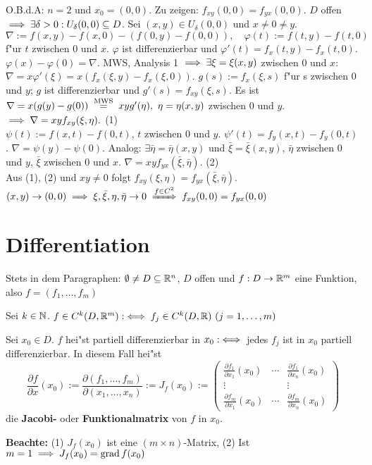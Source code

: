 \documentclass[a4paper,twoside,DIV15,BCOR12mm,chapterprefix=true,headings=twolinechapter]{scrbook}
\begin{document}
\begin{beweis}
O.B.d.A: $n=2$ und $x_0=(0,0)$. Zu zeigen: $f_{xy}(0,0)=f_{yx}(0,0)$. $D$ offen $\implies\exists\delta>0: U_\delta(0,0)\subseteq D$. Sei $(x,y) \in U_\delta(0,0)$ und $x\ne 0\ne y$. $$\nabla:=f(x,y)-f(x,0)-(f(0,y)-f(0,0)),\quad\varphi(t):=f(t,y)-f(t,0)$$ f"ur $t$ zwischen $0$ und $x$. $\varphi$ ist differenzierbar und $\varphi'(t)=f_x(t,y)-f_x(t,0)$. $\varphi(x)-\varphi(0)=\nabla$. MWS, Analysis 1 $\implies\exists\xi=\xi(x,y)$ zwischen $0$ und $x$: $\nabla=x\varphi'(\xi)=x(f_x(\xi,y)-f_x(\xi,0))$. $g(s):=f_x(\xi,s)$ f"ur s zwischen $0$ und $y$; $g$ ist differenzierbar und $g'(s)=f_{xy}(\xi,s)$. Es ist $\nabla=x(g(y)-g(0))\gleichnach{MWS}xyg'(\eta),\ \eta=\eta(x,y)$ zwischen $0$ und $y$. $\implies \nabla=xyf_{xy}(\xi,\eta).$ (1)\\
$\psi(t):=f(x,t)-f(0,t)$, $t$ zwischen $0$ und $y$. $\psi'(t)=f_y(x,t)-f_y(0,t)$. $\nabla=\psi(y)-\psi(0)$. Analog: $\exists \bar\eta=\bar\eta(x,y)$ und $\bar\xi=\bar\xi(x,y)$, $\bar\eta$ zwischen $0$ und $y$, $\bar\xi$ zwischen $0$ und $x$. $\nabla=xyf_{yx}(\bar\xi,\bar\eta).$ (2)\\
Aus (1), (2) und $xy\ne0$ folgt $f_{xy}(\xi,\eta)=f_{yx}(\bar\xi,\bar\eta)$. $(x,y)\to(0,0)\folgt\xi,\bar\xi,\eta,\bar\eta\to 0\folgtwegen{f\in C^2}f_{xy}(0,0)=f_{yx}(0,0)$
\end{beweis}

\chapter{Differentiation}
\def\grad{\mathop{\rm grad}\nolimits}

\begin{vereinbarung}
Stets in dem Paragraphen: $\emptyset\ne D\subseteq\mathbb{R}^n$, $D$ offen und $f:D\to\mathbb{R}^m$ eine Funktion, also $f=(f_1,\ldots,f_m)$
\end{vereinbarung}

\begin{definition*}
\begin{liste}
\item Sei $k\in\mathbb{N}$. $f\in C^k(D,\MdR^m) :\equizu f_j\in C^k(D,\MdR)\ (j=1,\ldots,m)$
\item Sei $x_0\in D$. $f$ hei"st partiell differenzierbar in $x_0 :\iff$ jedes $f_j$ ist in $x_0$ partiell differenzierbar. In diesem Fall hei"st
$$\frac{\partial f}{\partial x}(x_0):=\frac{\partial(f_1,\ldots,f_m)}{\partial(x_1,\ldots,x_n)}:=J_f(x_0):=\begin{pmatrix}
\frac{\partial f_1}{\partial x_1}(x_0) & \cdots & \frac{\partial f_1}{\partial x_n}(x_0) \\
\vdots & & \vdots \\
\frac{\partial f_m}{\partial x_1}(x_0) & \cdots & \frac{\partial f_m}{\partial x_n}(x_0)
\end{pmatrix}$$
die \textbf{Jacobi-} oder \textbf{Funktionalmatrix} von $f$ in $x_0$.
\end{liste}
\textbf{Beachte:}
(1) $J_f(x_0)$ ist eine $(m \times n)$-Matrix, (2) Ist $m=1\folgt J_f(x_0)=\grad f(x_0)$
\end{definition*}
\end{document}
